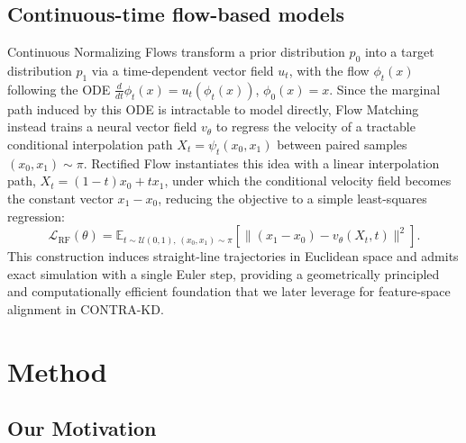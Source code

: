 \documentclass{article} %
\theoremstyle{definition}
\theoremstyle{remark}
\begin{document}
\subsection{Continuous-time flow-based models}
Continuous Normalizing Flows transform a prior distribution $p_0$ into a target distribution $p_1$ via a time-dependent vector field $u_t$, with the flow $\phi_t(x)$ following the ODE $\frac{d}{dt}\phi_t(x) = u_t(\phi_t(x))$, $\phi_0(x) = x$. Since the marginal path induced by this ODE is intractable to model directly, Flow Matching \cite{lipman2023flowmatchinggenerativemodeling} instead trains a neural vector field $v_\theta$ to regress the velocity of a tractable conditional interpolation path $X_t = \psi_t(x_0, x_1)$ between paired samples $(x_0, x_1) \sim \pi$. Rectified Flow \cite{liu2022flowstraightfastlearning} instantiates this idea with a linear interpolation path, $X_t = (1-t)x_0 + tx_1$, under which the conditional velocity field becomes the constant vector $x_1 - x_0$, reducing the objective to a simple least-squares regression:
\begin{equation}
\mathcal{L}_{\text{RF}}(\theta) = \mathbb{E}_{t\sim\mathcal{U}(0,1),\, (x_0,x_1)\sim\pi}\left[\|(x_1-x_0) - v_\theta(X_t,t)\|^2\right].
\end{equation}
This construction induces straight-line trajectories in Euclidean space and admits exact simulation with a single Euler step, providing a geometrically principled and computationally efficient foundation that we later leverage for feature-space alignment in CONTRA-KD.

\section{Method}

\subsection{Our Motivation}
\label{sec:motivation}
\end{document}

